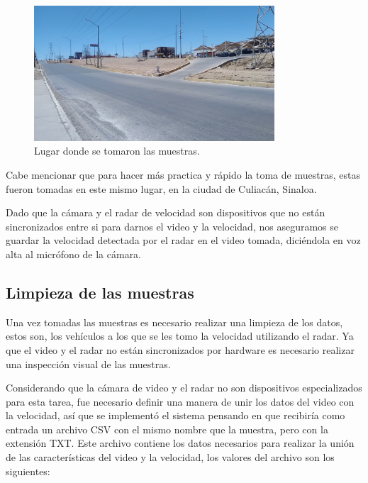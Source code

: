 \begin{figure}[H]
    \centering
    \includegraphics[width=0.8\textwidth]{Metodologia/imgs/LugarMuestras.jpg}
    \caption{Lugar donde se tomaron las muestras.}
    \label{fig:LugarMuestrasDataset}
\end{figure}

Cabe mencionar que para hacer más practica y rápido la toma de muestras, estas fueron tomadas en este mismo lugar, en la ciudad de Culiacán, Sinaloa.

Dado que la cámara y el radar de velocidad son dispositivos que no están sincronizados entre si para darnos el video y la velocidad, nos aseguramos se guardar la velocidad detectada por el radar en el video tomada, diciéndola en voz alta al micrófono de la cámara.


\subsection{Limpieza de las muestras}

Una vez tomadas las muestras es necesario realizar una limpieza de los datos, estos son, los vehículos a los que se les tomo la velocidad utilizando el radar. Ya que el video y el radar no están sincronizados por hardware es necesario realizar una inspección visual de las muestras.

Considerando que la cámara de video y el radar no son dispositivos especializados para esta tarea, fue necesario definir una manera de unir los datos del video con la velocidad, así que se implementó el sistema pensando en que recibiría como entrada un archivo CSV con el mismo nombre que la muestra, pero con la extensión TXT. Este archivo contiene los datos necesarios para realizar la unión de las características del video y la velocidad, los valores del archivo son los siguientes:

